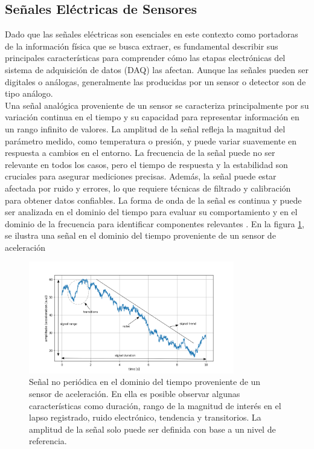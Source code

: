 \documentclass[]{book}
\begin{document}
\subsection{Señales Eléctricas de Sensores}

\noindent Dado que las señales eléctricas son esenciales en este contexto como portadoras de la información física que se busca extraer, es fundamental describir sus principales características para comprender cómo las etapas electrónicas del sistema de adquisición de datos (DAQ) las afectan. Aunque las señales pueden ser digitales o análogas, generalmente las producidas por un sensor o detector son de tipo análogo. \\

\noindent Una señal analógica proveniente de un sensor se caracteriza principalmente por su variación continua en el tiempo y su capacidad para representar información en un rango infinito de valores. La amplitud de la señal refleja la magnitud del parámetro medido, como temperatura o presión, y puede variar suavemente en respuesta a cambios en el entorno. La frecuencia de la señal puede no ser relevante en todos los casos, pero el tiempo de respuesta y la estabilidad son cruciales para asegurar mediciones precisas. Además, la señal puede estar afectada por ruido y errores, lo que requiere técnicas de filtrado y calibración para obtener datos confiables. La forma de onda de la señal es continua y puede ser analizada en el dominio del tiempo para evaluar su comportamiento y en el dominio de la frecuencia para identificar componentes relevantes \cite{sinclair2000sensors}. En la figura \ref{fig:generic_signal}, se ilustra una señal en el dominio del tiempo proveniente de un sensor de aceleración

\begin{figure}[h]
    \centering
    \includegraphics[width=0.8\textwidth]{mysignal.png}
    \caption{Señal no periódica en el dominio del tiempo proveniente de un sensor de aceleración. En ella es posible observar algunas características como duración, rango de la magnitud de interés en el lapso registrado, ruido electrónico, tendencia y transitorios. La amplitud de la señal solo puede ser definida con base a un nivel de referencia.}
    \label{fig:generic_signal}

\end{figure}
\end{document}
